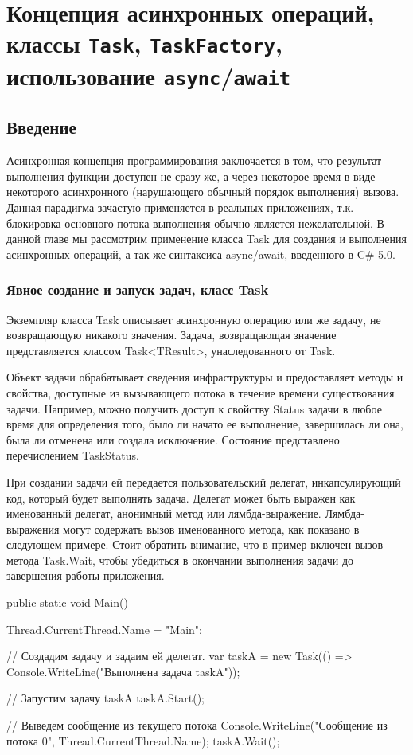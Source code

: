 \section{Концепция асинхронных операций, классы \texttt{Task}, \texttt{TaskFactory}, использование \texttt{async}/\texttt{await}}

\subsection{Введение}

Асинхронная концепция программирования заключается в том, что результат выполнения функции доступен не сразу же, а через некоторое время в виде некоторого асинхронного (нарушающего обычный порядок выполнения) вызова. Данная парадигма зачастую применяется в реальных приложениях, т.к. блокировка основного потока выполнения обычно является нежелательной. В данной главе мы рассмотрим применение класса Task для создания и выполнения асинхронных операций, а так же синтаксиса async/await, введенного в C# 5.0.

\subsubsection{Явное создание и запуск задач, класс Task}

Экземпляр класса Task описывает асинхронную операцию или же задачу, не возвращающую никакого значения. 
Задача, возвращающая значение представляется классом Task<TResult>, унаследованного от Task.

Объект задачи обрабатывает сведения инфраструктуры и предоставляет методы и свойства, доступные из вызывающего потока в течение времени существования задачи. Например, можно получить доступ к свойству Status задачи в любое время для определения того, было ли начато ее выполнение, завершилась ли она, была ли отменена или создала исключение. Состояние представлено перечислением TaskStatus.

При создании задачи ей передается пользовательский делегат, инкапсулирующий код, который будет выполнять задача. Делегат может быть выражен как именованный делегат, анонимный метод или лямбда-выражение. Лямбда-выражения могут содержать вызов именованного метода, как показано в следующем примере. Стоит обратить внимание, что в пример включен вызов метода Task.Wait, чтобы убедиться в окончании выполнения задачи до завершения работы приложения.

public static void Main()
{
  Thread.CurrentThread.Name = "Main";

  // Создадим задачу и задаим ей делегат.
  var taskA = new Task(() => Console.WriteLine("Выполнена задача taskA"));
  
  // Запустим задачу taskA
  taskA.Start();

  // Выведем сообщение из текущего потока
  Console.WriteLine("Сообщение из потока {0}", 
                    Thread.CurrentThread.Name);
  taskA.Wait();
}

